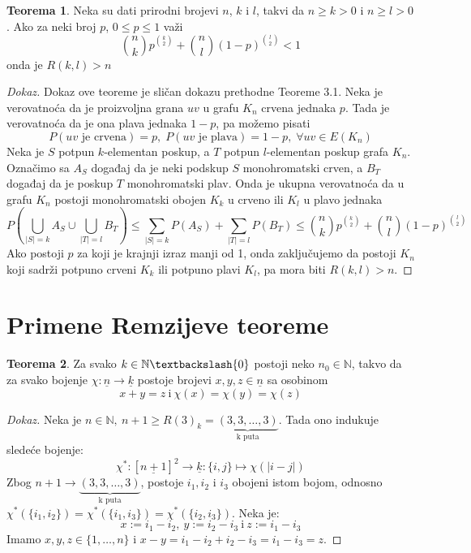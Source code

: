\documentclass{article}
\theoremstyle{definition}
\newtheorem{teorema}{Teorema}[section]
\newcommand{\dokaz}[1]{\begin{proof}[Dokaz]#1\end{proof}}
\begin{document}
	\begin{teorema}\label{dot2}
	Neka su dati prirodni brojevi $n$, $k$ i $l$, takvi da $n \geq{k} > 0$ i $n \geq{l} > 0$. Ako za neki broj $p$, $0 \leq{p} \leq 1$ važi
	$$\binom{n}{k}p^{\binom{k}{2}} + \binom{n}{l}(1 - p)^{\binom{l}{2}} < 1$$ onda je $R(k,l) > n$
	\dokaz{
		Dokaz ove teoreme je sličan dokazu prethodne Teoreme 3.1. Neka je verovatnoća da je proizvoljna grana $uv$ u grafu $K_n$ crvena jednaka $p$. Tada je verovatnoća da je ona               	plava jednaka $1 - p$, pa možemo pisati 
		$$P(uv \text{ je crvena}) = p,\; P(uv \text{ je plava}) = 1 - p, \; \forall uv \in E(K_n)$$
		Neka je $S$ potpun $k$-elementan poskup, a $T$ potpun $l$-elementan poskup grafa $K_n$. Označimo sa $A_S$ događaj da je neki podskup $S$ monohromatski crven, a $B_T$ događaj  	da je poskup $T$ monohromatski plav. Onda je ukupna verovatnoća da u grafu $K_n$ postoji monohromatski obojen $K_k$ u crveno ili $K_l$ u plavo jednaka
		$$P\left(\bigcup_{|S|=k}A_S \cup \bigcup_{|T|=l}B_T \right) \leq \sum_{|S|=k}P(A_S) + \sum_{|T|=l}P(B_T) \leq \binom{n}{k}p^{\binom{k}{2}} + \binom{n}{l}(1 - p)^{\binom{l}{2}}$$
		Ako postoji $p$ za koji je krajnji izraz manji od 1, onda zaključujemo da postoji $K_n$  koji sadrži potpuno crveni $K_k$ ili potpuno plavi $K_l$, pa mora biti $R(k,l)>n$.
	}
	\end{teorema}

		\section{Primene Remzijeve teoreme}
		\begin{teorema}\label{sur}
			Za svako $k \in \mathbb{N}\textbackslash \{0\}$  postoji neko $n_{0} \in \mathbb{N}$, takvo da za svako bojenje $\chi:\underline{n} \rightarrow \underline{k}$ postoje brojevi $x, y, z \in \underline{n}$ sa osobinom 
			\[
			x + y = z \: \mathrm{i} \: \chi(x)= \chi(y)=\chi(z)
			\]
		\end{teorema}
		\dokaz{
			Neka je $n \in \mathbb{N},\: n+1 \geq R(3)_k=\underbrace{(3,3,\ldots,3)}_\text{k puta}$. Tada ono indukuje sledeće bojenje:
			\[
				\chi^*:[\underline{n+1}]^2\rightarrow \underline{k}:\{i,j\}\mapsto \chi(|i-j|)
			\]
			Zbog $n+1 \rightarrow \underbrace{(3,3,\ldots,3)}_\text{k puta}$, postoje $i_1, i_2$ i $i_3$ obojeni istom bojom, odnosno $\chi^*(\{i_1,i_2\})=\chi^*(\{i_1,i_3\})=\chi^*(\{i_2,i_3\})$. Neka je:
			\[
				x:=i_1-i_2,\:y:=i_2-i_3\:\mathrm{i}\:z:=i_1-i_3
			\]
			Imamo $x,y,z\in \{1,\ldots,n\}$ i $x-y=i_1-i_2+i_2-i_3=i_1-i_3=z$.
		}
\end{document}
